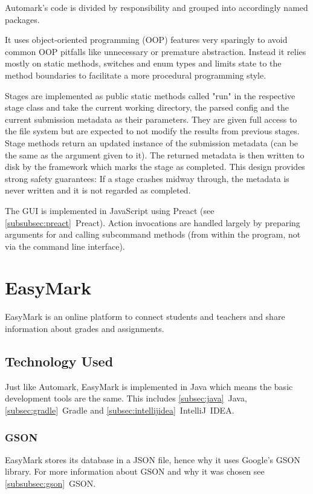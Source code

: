 \documentclass[12pt,a4paper,oneside]{report}
\begin{document}
	Automark's code is divided by responsibility and grouped into accordingly named packages.

	It uses object-oriented programming (OOP) features very sparingly to avoid common OOP pitfalls like unnecessary or premature abstraction. Instead it relies mostly on static methods, switches and enum types and limits state to the method boundaries to facilitate a more procedural programming style.

	Stages are implemented as public static methods called "run" in the respective stage class and take the current working directory, the parsed config and the current submission metadata as their parameters. They are given full access to the file system but are expected to not modify the results from previous stages. Stage methods return an updated instance of the submission metadata (can be the same as the argument given to it). The returned metadata is then written to disk by the framework which marks the stage as completed. This design provides strong safety guarantees: If a stage crashes midway through, the metadata is never written and it is not regarded as completed.

	The GUI is implemented in JavaScript using Preact (see \ref{subsubsec:preact}~Preact). Action invocations are handled largely by preparing arguments for and calling subcommand methods (from within the program, not via the command line interface).

	\chapter{EasyMark}
	EasyMark is an online platform to connect students and teachers and share information about grades and assignments.

	\section{Technology Used}
	Just like Automark, EasyMark is implemented in Java which means the basic development tools are the same. This includes \ref{subsec:java}~Java, \ref{subsec:gradle}~Gradle and \ref{subsec:intellijidea}~IntelliJ~IDEA.

	\subsection{GSON}
	EasyMark stores its database in a JSON file, hence why it uses Google's GSON library. For more information about GSON and why it was chosen see \ref{subsubsec:gson}~GSON.
\end{document}
